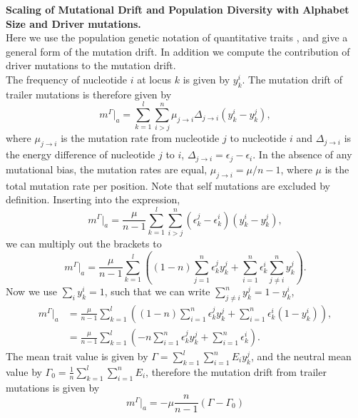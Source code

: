 \textbf{Scaling of Mutational Drift and Population Diversity with Alphabet Size and Driver mutations.}\\

\noindent Here we use the population genetic notation of quantitative traits \cite{nourmohammad_evolution_2013}, and give a general form of the mutation drift. In addition we compute the contribution of driver mutations to the mutation drift.\\
The frequency of nucleotide $i$ at locus $k$ is given by $y_k^i$. The mutation drift of trailer mutations is therefore given by
\begin{equation}
m^{\Gamma}|_a=\sum_{k=1}^{l}\sum_{i>j}^{n}\mu_{j\rightarrow i}\Delta_{j\rightarrow i}(y_k^i-y_k^j),
\end{equation}
where $ \mu_{j\rightarrow i}$ is the mutation rate from nucleotide $j$ to nucleotide $i$ and $\Delta_{j\rightarrow i}$ is the energy difference of nucleotide $j$ to $i$, $\Delta_{j\rightarrow i}=\epsilon_j-\epsilon_i$. In the absence of any mutational bias, the mutation rates are equal, $\mu_{j\rightarrow i}=\mu/n-1$, where $\mu$ is the total mutation rate per position. Note that self mutations are excluded by definition. Inserting into the expression,
\begin{equation}
	m^\Gamma|_a=\frac{\mu}{n-1}\sum_{k=1}^{l}\sum_{i>j}^{n}(\epsilon_k^j-\epsilon_k^i)(y_k^i-y_k^j),
\end{equation}
we can multiply out the brackets to
\begin{equation}
		m^\Gamma|_a=\frac{\mu}{n-1}\sum_{k=1}^{l}\left((1-n)\sum_{j=1}^{n}\epsilon_k^jy_k^j+\sum_{i=1}^{n}\epsilon_k^i\sum_{j\neq i}^{n}y_k^j\right).
\end{equation}
Now we use $\sum_{i}y_k^i=1$, such that we can write $\sum_{j\neq i}^{n}y_k^j = 1 - y_k^i$,
\begin{align}
m^{\Gamma}|_a&=\frac{\mu}{n-1}\sum_{k=1}^{l}\left((1-n)\sum_{i=1}^{n}\epsilon_k^jy_k^j+\sum_{i=1}^{n}\epsilon_k^i(1-y_k^i)\right),\nonumber\\
&=\frac{\mu}{n-1}\sum_{k=1}^{l}\left(-n\sum_{i=1}^{n}\epsilon_k^jy_k^j+\sum_{i=1}^{n}\epsilon_k^i\right).
\end{align}
The mean trait value is given by $\Gamma=\sum_{k=1}^l\sum_{i=1}^{n}E_iy_k^j$, and the neutral mean value by $\Gamma_0=\frac{1}{n}\sum_{k=1}^l\sum_{i=1}^nE_i$, therefore the mutation drift from trailer mutations is given by
\begin{equation}
	m^{\Gamma}|_a=-\mu\frac{n}{n-1}\left(\Gamma-\Gamma_0\right)
\end{equation}
